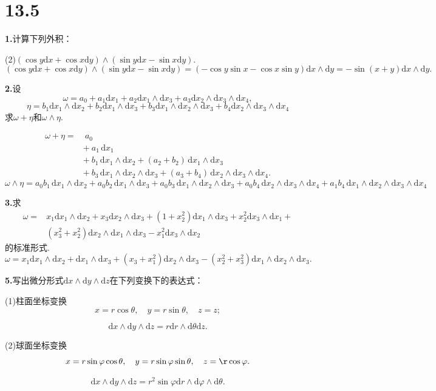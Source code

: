 \documentclass[12pt, a4paper]{article}
\newcommand{\dif}{\mathrm{d}}
\begin{document}
\section*{13.5}
\textbf{1.}计算下列外积：

(2)\((\cos y\dif x + \cos x\dif y) \wedge (\sin y\dif x - \sin x\dif y)\).
\[(\cos y\dif x + \cos x\dif y) \wedge (\sin y\dif x - \sin x\dif y) = (-\cos y\sin x - \cos x\sin y) \dif x \wedge \dif y = -\sin(x + y) \dif x \wedge \dif y.\]

\textbf{2.}设
\[\omega = a_0 + a_1\dif x_1 + a_2\dif x_1 \wedge \dif x_3 + a_3 \dif x_2 \wedge \dif x_3 \wedge \dif x_4,\]
\[\eta = b_1\dif x_1 \wedge \dif x_2 + b_2\dif x_1 \wedge \dif x_3 + b_3\dif x_1 \wedge \dif x_2 \wedge \dif x_3 + b_4 \dif x_2 \wedge \dif x_3 \wedge \dif x_4\]
求\(\omega + \eta\)和\(\omega \wedge \eta\).

\begin{align*}
\omega + \eta =&\ a_0 \\
&+\ a_1\,\mathrm{d}x_1 \\
&+\ b_1\,\mathrm{d}x_1 \wedge \mathrm{d}x_2 + (a_2 + b_2)\,\mathrm{d}x_1 \wedge \mathrm{d}x_3 \\
&+\ b_3\,\mathrm{d}x_1 \wedge \mathrm{d}x_2 \wedge \mathrm{d}x_3 + (a_3 + b_4)\,\mathrm{d}x_2 \wedge \mathrm{d}x_3 \wedge \mathrm{d}x_4.
\end{align*}
\[\omega \wedge \eta = a_0 b_1\,\mathrm{d}x_1 \wedge \mathrm{d}x_2 + a_0 b_2\,\mathrm{d}x_1 \wedge \mathrm{d}x_3 + a_0 b_3\,\mathrm{d}x_1 \wedge \mathrm{d}x_2 \wedge \mathrm{d}x_3 + a_0 b_4\,\mathrm{d}x_2 \wedge \mathrm{d}x_3 \wedge \mathrm{d}x_4 + a_1 b_4\,\mathrm{d}x_1 \wedge \mathrm{d}x_2 \wedge \mathrm{d}x_3 \wedge \mathrm{d}x_4\]

\textbf{3.}求
\begin{align*}
\omega = &x_1\dif x_1 \wedge \dif x_2 + x_3 \dif x_2 \wedge \dif x_3 + (1 + x_2^2)\dif x_1 \wedge \dif x_3 + x_2^2 \dif x_3 \wedge \dif x_1 + \\
&(x_3^2 + x_2^2)\dif x_2 \wedge \dif x_1 \wedge \dif x_3 - x_1^2\dif x_3 \wedge \dif x_2
\end{align*}
的标准形式.
\[\omega = x_1 \dif x_1 \wedge \dif x_2 + \dif x_1 \wedge \dif x_3 + (x_3 + x_1^2) \dif x_2 \wedge \dif x_3 - (x_2^2 + x_3^2)\dif x_1 \wedge \dif x_2 \wedge \dif x_3.\]

\textbf{5.}写出微分形式\(\dif x \wedge \dif y \wedge \dif z\)在下列变换下的表达式：

(1)柱面坐标变换
\[x = r\cos\theta, \quad y = r\sin \theta, \quad z = z;\]

\[\dif x \wedge \dif y \wedge \dif z = r\dif r \wedge \dif \theta \dif z.\]

(2)球面坐标变换
\[x = r\sin\varphi\cos\theta, \quad y = r\sin\varphi\sin\theta, \quad z = \r\cos\varphi.\]

\[\dif x \wedge \dif y \wedge \dif z = r^2\sin\varphi \dif r \wedge \dif \varphi \wedge \dif \theta.\]
\end{document}
